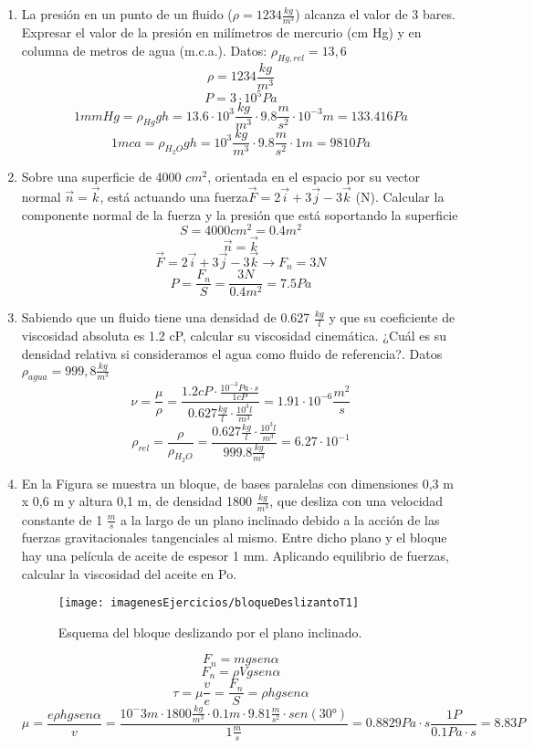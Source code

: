 \begin{enumerate}
\begin{figure}[H]
\begin{minipage}{0.3\textwidth}
	\end{minipage}
\end{figure}

	\newpage
	\item La presión en un punto de un fluido ($\rho = 1234 \frac{kg}{m^3}$) alcanza el valor de 3 bares. Expresar
	el valor de la presión en milímetros de mercurio (cm Hg) y en columna de metros de agua
	(m.c.a.). Datos: $\rho_{Hg,rel} = 13,6$
	\[\rho = 1234 \frac{kg}{m^3}\]
	\[P=3\cdot10^5 Pa\]
	\[1mmHg=\rho_{Hg}g h=13.6\cdot10^3\frac{kg}{m^3} \cdot9.8 \frac{m}{s^2}\cdot10^{-3}m=133.416Pa \]
	\[1mca=\rho_{H_2O}g h=10^3\frac{kg}{m^3}\cdot9.8 \frac{m}{s^2}\cdot1m=9810Pa\]
	\item Sobre una superficie de 4000 $cm^2$, orientada en el espacio por su vector normal $\vec{n}=\vec{k}$, está
	actuando una fuerza$\vec{F}=2\vec{i}+3\vec{j}-3\vec{k}$ (N). Calcular la componente normal de la fuerza y
	la presión que está soportando la superficie
		\[S=4000 cm^2=0.4 m^2\]
	\[\vec{n}=\vec{k}\]
	\[\vec{F}=2\vec{i}+3\vec{j}-3\vec{k} \rightarrow F_n=3N\]
	\[P=\frac{F_n}{S}=\frac{3 N}{0.4 m^2}=7.5Pa\]
	
	\item Sabiendo que un fluido tiene una densidad de 0.627 $\frac{kg}{l}$ y que su coeficiente de viscosidad
	absoluta es 1.2 cP, calcular su viscosidad cinemática. ¿Cuál es su densidad relativa si
	consideramos el agua como fluido de referencia?. Datos $\rho_{agua} = 999,8\frac{kg}{m^3}$
\[\nu = \frac{\mu}{\rho}=\frac{1.2 cP \cdot \frac{10^{-3} Pa \cdot s}{1 cP}}{0.627 \frac{kg}{l}\cdot\frac{10^3 l}{m^3}}=1.91\cdot10^{-6}\frac{m^2}{s}\]
\[\rho_{rel}=\frac{\rho}{\rho_{H_2O}}=\frac{0.627 \frac{kg}{l}\cdot\frac{10^3 l}{m^3}}{999.8 \frac{kg}{m^3}}=6.27\cdot10^{-1}\]
	
	\newpage
	\item En la Figura se muestra un bloque, de bases paralelas con dimensiones 0,3 m x 0,6
	m y altura 0,1 m, de densidad 1800 $\frac{kg}{m^3}$, que desliza con una velocidad constante de
	1 $\frac{m}{s}$ a la largo de un plano inclinado debido a la acción de las fuerzas gravitacionales
	tangenciales al mismo. Entre dicho plano y el bloque hay una película de aceite de espesor
	1 mm. Aplicando equilibrio de fuerzas, calcular la viscosidad del aceite en Po.
	\begin{figure}[H]
		
		\centering
		\texttt{[image: imagenesEjercicios/bloqueDeslizantoT1]}
		\caption{Esquema del bloque deslizando por el plano inclinado.}
		\label{fig:bloquedeslizantot1}
	\end{figure}
	\[F_n=m g sen\alpha\]
	\[F_n=\rho V g sen\alpha\]
	\[\tau=\mu\frac{v}{e}=\frac{F_n}{S}=\rho h g sen\alpha\]
	\[\mu=\frac{e\rho h g sen\alpha}{v}=\frac{10^-3m\cdot1800\frac{kg}{m^3}\cdot0.1m\cdot 9.81 \frac{m}{s^2} \cdot sen(\ang{30})}{1\frac{m}{s}}=0.8829Pa\cdot s\frac{1 P}{0.1 Pa \cdot s}=8.83P\]
\end{enumerate}
